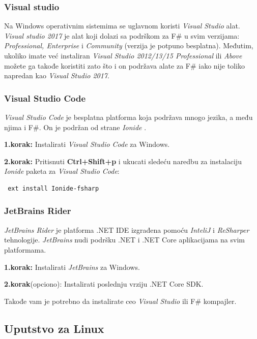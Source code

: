 \documentclass[a4paper]{article}
\begin{document}
\subsubsection{Visual studio}
	
Na Windows operativnim sistemima se uglavnom koristi {\em Visual Studio} alat. {\em Visual studio 2017} je alat koji dolazi sa podrškom za F\# u svim verzijama: {\em Professional, Enterprise} i {\em Community} (verzija je potpuno besplatna). Međutim, ukoliko imate  već instaliran {\em Visual Studio 2012/13/15  Professional} ili {\em Above} možete ga takođe koristiti zato što i on podržava alate za F\# iako nije toliko napredan kao {\em Visual Studio 2017}.

\subsubsection{Visual Studio Code}
	
{\em Visual Studio Code} je besplatna platforma koja podržava mnogo jezika, a među njima i F\#. On je podržan od strane {\em Ionide} \cite{ionide}.

\textbf{1.korak:} Instalirati {\em Visual Studio Code} za Windows.

\textbf{2.korak:} Pritisnuti \textbf{Ctrl+Shift+p} i ukucati sledeću naredbu za instalaciju {\em Ionide} paketa za {\em Visual Studio Code}:
\\
\begin{lstlisting}
 ext install Ionide-fsharp
\end{lstlisting}
 
\subsubsection{JetBrains Rider}

{\em JetBrains Rider} je platforma .NET IDE izgrađena pomoću {\em InteliJ} i {\em ReSharper} tehnologije. {\em JetBrains} nudi podršku .NET i .NET Core aplikacijama na svim platformama.

\textbf{1.korak:} Instalirati {\em JetBrains} za Windows.

\textbf{2.korak}(opciono): Instalirati poslednju vrziju .NET Core SDK.

Takođe vam je potrebno da instalirate ceo {\em Visual Studio} ili F\# kompajler.


\subsection{Uputstvo za Linux}
\end{document}
